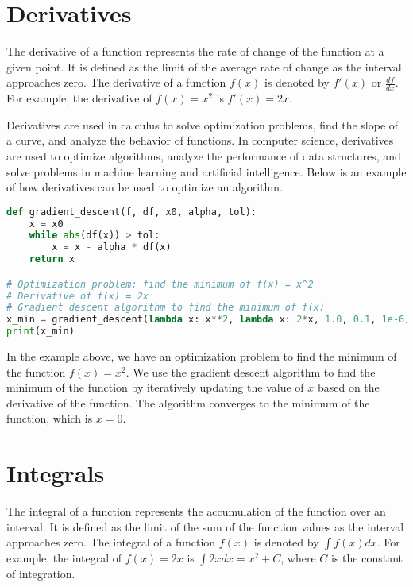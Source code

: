 \section{Derivatives}

The derivative of a function represents the rate of change of the function at a given point. It is defined as the limit of the average rate of change as the interval approaches zero. The derivative of a function $f(x)$ is denoted by $f'(x)$ or $\frac{df}{dx}$. For example, the derivative of $f(x) = x^2$ is $f'(x) = 2x$.

Derivatives are used in calculus to solve optimization problems, find the slope of a curve, and analyze the behavior of functions. In computer science, derivatives are used to optimize algorithms, analyze the performance of data structures, and solve problems in machine learning and artificial intelligence. Below is an example of how derivatives can be used to optimize an algorithm.

\newpage
\begin{lstlisting}[language=Python, caption=Example of using derivatives to optimize algorithm]
def gradient_descent(f, df, x0, alpha, tol):
    x = x0
    while abs(df(x)) > tol:
        x = x - alpha * df(x)
    return x

# Optimization problem: find the minimum of f(x) = x^2
# Derivative of f(x) = 2x
# Gradient descent algorithm to find the minimum of f(x)
x_min = gradient_descent(lambda x: x**2, lambda x: 2*x, 1.0, 0.1, 1e-6)
print(x_min)
\end{lstlisting}

In the example above, we have an optimization problem to find the minimum of the function $f(x) = x^2$. We use the gradient descent algorithm to find the minimum of the function by iteratively updating the value of $x$ based on the derivative of the function. The algorithm converges to the minimum of the function, which is $x = 0$.

\section{Integrals}

The integral of a function represents the accumulation of the function over an interval. It is defined as the limit of the sum of the function values as the interval approaches zero. The integral of a function $f(x)$ is denoted by $\int f(x) dx$. For example, the integral of $f(x) = 2x$ is $\int 2x dx = x^2 + C$, where $C$ is the constant of integration.

